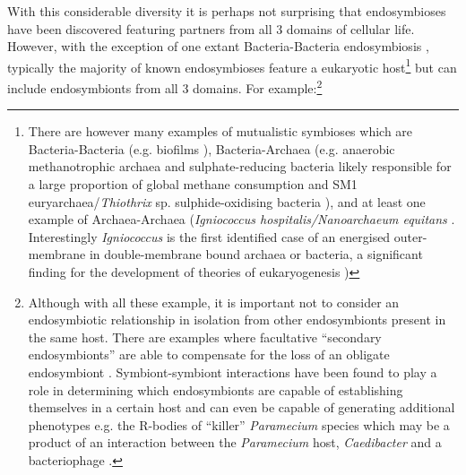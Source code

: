 With this considerable diversity it is perhaps not surprising that endosymbioses have been discovered featuring partners from all 3 domains of cellular life. %
However, with the exception of one extant Bacteria-Bacteria endosymbiosis \citep{vonDohlen2001}, typically the majority of known
endosymbioses feature a eukaryotic host\footnote{There are however many examples of mutualistic symbioses which are Bacteria-Bacteria (e.g. biofilms \citep{Watnick2000}),
    Bacteria-Archaea (e.g. anaerobic methanotrophic archaea and sulphate-reducing bacteria likely responsible
    for a large proportion of global methane consumption \citep{Boetius2000,Knittel2009} and SM1 
    euryarchaea/\textit{Thiothrix} sp. sulphide-oxidising bacteria \citep{Henneberger2006,Wrede2012}), 
    and at least one example of Archaea-Archaea (\textit{Igniococcus hospitalis/Nanoarchaeum equitans} \citep{Huber2002}. 
    Interestingly \textit{Igniococcus} is the first identified case of an energised outer-membrane in 
    double-membrane bound archaea or bacteria, a significant finding for the development of theories of
eukaryogenesis \citep{Kuper2010})} but can include endosymbionts from all 3 domains.
For example:\footnote{Although with all these example, it is important not 
    to consider an endosymbiotic relationship 
    in isolation from other endosymbionts present in the same host.
    There are examples where facultative ``secondary endosymbionts'' 
    are able to compensate for the loss of an obligate endosymbiont \citep{Koga2003}.  Symbiont-symbiont 
    interactions have been found to play a role in determining which endosymbionts are capable of establishing themselves 
    in a certain host and can even be capable of generating additional phenotypes e.g. the R-bodies of ``killer'' \textit{Paramecium} 
    species which may be a product of an interaction between the \textit{Paramecium} host, \textit{Caedibacter} and a bacteriophage
    \citep{Schrallhammer2009}. %
}
